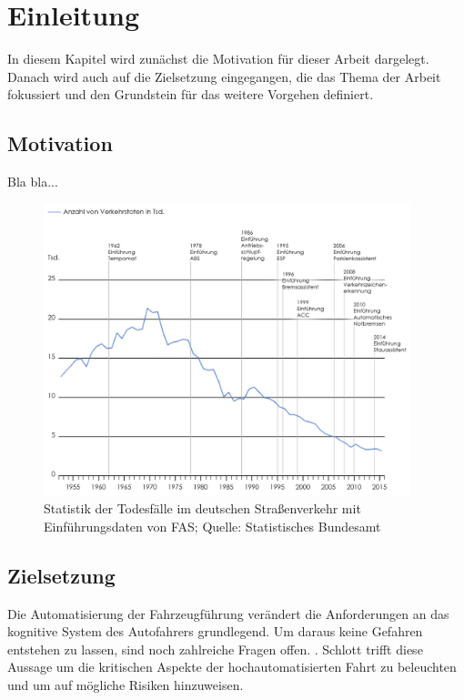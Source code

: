 \section{Einleitung}

In diesem Kapitel wird zunächst die Motivation für dieser Arbeit dargelegt. Danach wird auch auf die Zielsetzung eingegangen, die das Thema der Arbeit fokussiert und den Grundstein für das weitere Vorgehen definiert.

\subsection{Motivation}
Bla bla...
\begin{figure}[H]
	\centering
	\includegraphics[width= 0.95\textwidth]{images/statistik1}
	\caption[Verlauf der Anzahl an Todesopfer im deutschen Straßenverkehr von 1953 bis 2016 in Kombination mit Einführung von Fahrerassistenzsystemen]{Statistik der Todesfälle im deutschen Straßenverkehr mit Einführungsdaten von FAS; Quelle: Statistisches Bundesamt \protect\cite{sba}}  
	\label{fig:sba}
\end{figure}

\subsection{Zielsetzung}
\glqq Die Automatisierung der Fahrzeugführung verändert die Anforderungen an das kognitive System des Autofahrers grundlegend. Um daraus keine Gefahren entstehen zu lassen, sind noch zahlreiche Fragen offen.\grqq{} \cite{schlott}. Schlott trifft diese Aussage um die kritischen Aspekte der hochautomatisierten Fahrt zu beleuchten und um auf mögliche Risiken hinzuweisen. 

